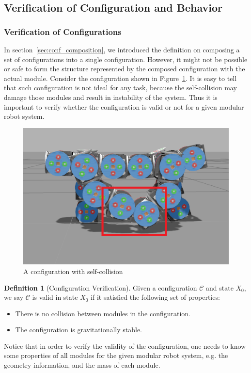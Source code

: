 \documentclass[conference]{IEEEtran}
\theoremstyle{definition}
\newtheorem{definition}{Definition}[section]
\begin{document}
\subsection{ Verification of Configuration and Behavior}

\subsubsection{Verification of Configurations}\label{sec:verify_conf} In section~\ref{sec:conf_composition}, we introduced the definition on composing a set of configurations into a single configuration. However, it might not be possible or safe to form the structure represented by the composed configuration with the actual module. Consider the configuration shown in Figure~\ref{fig:smores_conf_collision}. It is easy to tell that such configuration is not ideal for any task, because the self-collision may damage those modules and result in instability of the system. Thus it is important to verify whether the configuration is valid or not for a given modular robot system.

\begin{figure}
\begin{center}
\includegraphics[width=0.5\columnwidth]{images/walkbot_collision.png}
\end{center}
\caption{A configuration with self-collision}
\label{fig:smores_conf_collision}
\end{figure}

\begin{definition}[Configuration Verification]
Given a configuration $\mathcal{C}$ and state \(X_0\), we say $\mathcal{C}$ is valid in
state \(X_0\) if it satisfied the following set of properties:
\begin{itemize}
\item There is no collision between modules in the configuration.
\item The configuration is gravitationally stable.
\end{itemize}
Notice that in order to verify the validity of the configuration, one needs to know some properties of all modules for the given modular robot system, e.g. the geometry information, and the mass of each module.
\end{definition}
\end{document}

